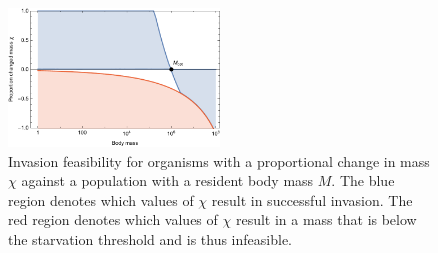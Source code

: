 \documentclass{pnastwo}
\begin{document}
\begin{figure}
\centering
\includegraphics[width=0.5\textwidth]{fig_Invasion.pdf}
\caption{
Invasion feasibility for organisms with a proportional change in mass $\chi$ against a population with a resident body mass $M$.
The blue region denotes which values of $\chi$ result in successful invasion.
The red region denotes which values of $\chi$ result in a mass that is below the starvation threshold and is thus infeasible.
}
\label{fig:invasion}
\end{figure}  
 

% 
% 
%	 
%
%
%
%
%	 
% 
%	
%
\end{document}
